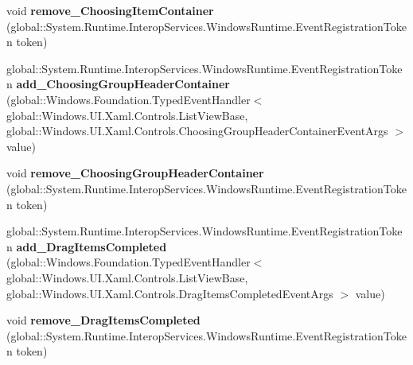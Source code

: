 \begin{DoxyCompactItemize}
void {\bfseries remove\+\_\+\+Choosing\+Item\+Container} (global\+::\+System.\+Runtime.\+Interop\+Services.\+Windows\+Runtime.\+Event\+Registration\+Token token)
\item 
\mbox{\label{interface_windows_1_1_u_i_1_1_xaml_1_1_controls_1_1_i_list_view_base4_a676b16cd7663b4ae45652525cdbe9e66}} 
global\+::\+System.\+Runtime.\+Interop\+Services.\+Windows\+Runtime.\+Event\+Registration\+Token {\bfseries add\+\_\+\+Choosing\+Group\+Header\+Container} (global\+::\+Windows.\+Foundation.\+Typed\+Event\+Handler$<$ global\+::\+Windows.\+U\+I.\+Xaml.\+Controls.\+List\+View\+Base, global\+::\+Windows.\+U\+I.\+Xaml.\+Controls.\+Choosing\+Group\+Header\+Container\+Event\+Args $>$ value)
\item 
\mbox{\label{interface_windows_1_1_u_i_1_1_xaml_1_1_controls_1_1_i_list_view_base4_acbca9310b039930aacfa0158b9dd0a63}} 
void {\bfseries remove\+\_\+\+Choosing\+Group\+Header\+Container} (global\+::\+System.\+Runtime.\+Interop\+Services.\+Windows\+Runtime.\+Event\+Registration\+Token token)
\item 
\mbox{\label{interface_windows_1_1_u_i_1_1_xaml_1_1_controls_1_1_i_list_view_base4_a8ded6e3ecc87209cec3cfd04f4282042}} 
global\+::\+System.\+Runtime.\+Interop\+Services.\+Windows\+Runtime.\+Event\+Registration\+Token {\bfseries add\+\_\+\+Drag\+Items\+Completed} (global\+::\+Windows.\+Foundation.\+Typed\+Event\+Handler$<$ global\+::\+Windows.\+U\+I.\+Xaml.\+Controls.\+List\+View\+Base, global\+::\+Windows.\+U\+I.\+Xaml.\+Controls.\+Drag\+Items\+Completed\+Event\+Args $>$ value)
\item 
\mbox{\label{interface_windows_1_1_u_i_1_1_xaml_1_1_controls_1_1_i_list_view_base4_aa8eed7aa7eefe8deffed7275d822d4ea}} 
void {\bfseries remove\+\_\+\+Drag\+Items\+Completed} (global\+::\+System.\+Runtime.\+Interop\+Services.\+Windows\+Runtime.\+Event\+Registration\+Token token)
\item 
\mbox{\label{interface_windows_1_1_u_i_1_1_xaml_1_1_controls_1_1_i_list_view_base4_a50b9a86d32b7a6ba60f5162b251de868}} 

\end{DoxyCompactItemize}
